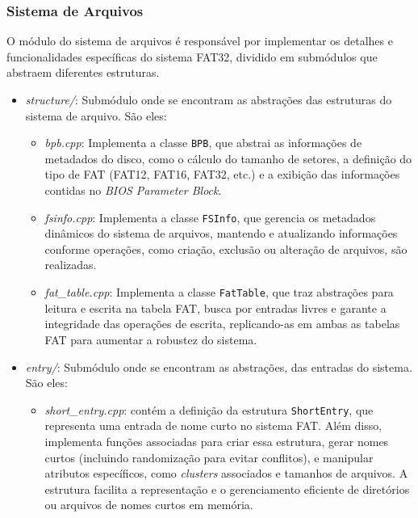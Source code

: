 \documentclass[
    12pt,				%
    oneside,   	        %
    a4paper,			%
    english,			%
    french,				%
    spanish,			%
    brazil,				%
    ]{pacotes/abntex2}
\begin{document}
\subsubsection{Sistema de Arquivos}
\label{subsubsec:fs}

O módulo do sistema de arquivos é responsável por implementar os detalhes e funcionalidades específicas do sistema FAT32, dividido em submódulos que abstraem diferentes estruturas. 

\begin{itemize} 
    \item \textit{structure/}: Submódulo onde se encontram as abstrações das estruturas do sistema de arquivo. São eles:
    \begin{itemize} 
        \item \textit{bpb.cpp}: Implementa a classe \texttt{BPB}, que abstrai as informações de metadados do disco, como o cálculo do tamanho de setores, a definição do tipo de FAT (FAT12, FAT16, FAT32, etc.) e a exibição das informações contidas no \textit{BIOS Parameter Block}. 
        
        \item \textit{fsinfo.cpp}: Implementa a classe \texttt{FSInfo}, que gerencia os metadados dinâmicos do sistema de arquivos, mantendo e atualizando informações conforme operações, como criação, exclusão ou alteração de arquivos, são realizadas. 
        
        \item \textit{fat\_table.cpp}: Implementa a classe \texttt{FatTable}, que traz abstrações para leitura e escrita na tabela FAT, busca por entradas livres e garante a integridade das operações de escrita, replicando-as em ambas as tabelas FAT para aumentar a robustez do sistema.
    \end{itemize}

    \item \textit{entry/}: Submódulo onde se encontram as abstrações, das entradas do sistema. São eles:
    \begin{itemize} 
        \item\textit{short\_entry.cpp}: contém a definição da estrutura \texttt{ShortEntry}, que representa uma entrada de nome curto no sistema FAT. Além disso, implementa funções associadas para criar essa estrutura, gerar nomes curtos (incluindo randomização para evitar conflitos), e manipular atributos específicos, como \textit{clusters} associados e tamanhos de arquivos. A estrutura facilita a representação e o gerenciamento eficiente de diretórios ou arquivos de nomes curtos em memória.


\end{itemize}
\end{itemize}
\end{document}
